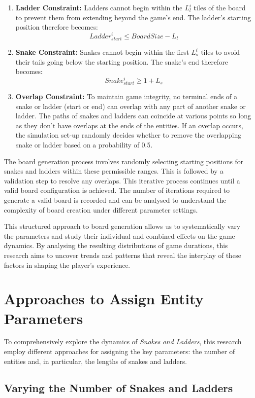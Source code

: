 \begin{enumerate}
	\item \textbf{Ladder Constraint:} Ladders cannot begin within the $L^{i}_{l}$ tiles of the board to prevent them from extending beyond the game's end. The ladder's starting position therefore becomes:  $$Ladder^{i}_{start} \leq BoardSize - L_{l}$$
	\item \textbf{Snake Constraint:} Snakes cannot begin within the first $L^{i}_{s}$ tiles to avoid their tails going below the starting position. The snake's end therefore becomes: $$Snake^{i}_{start}\geq 1 + L_{s}$$
	\item \textbf{Overlap Constraint:} To maintain game integrity, no terminal ends of a snake or ladder (start or end) can overlap with any part of another snake or ladder. The paths of snakes and ladders can coincide at various points so long as they don't have overlaps at the ends of the entities. If an overlap occurs, the simulation set-up randomly decides whether to remove the overlapping snake or ladder based on a probability of 0.5.
\end{enumerate}

The board generation process involves randomly selecting starting positions for snakes and ladders within these permissible ranges. This is followed by a validation step to resolve any overlaps. This iterative process continues until a valid board configuration is achieved. The number of iterations required to generate a valid board is recorded and can be analysed to understand the complexity of board creation under different parameter settings.

This structured approach to board generation allows us to systematically vary the parameters and study their individual and combined effects on the game dynamics. By analysing the resulting distributions of game durations, this research aims to uncover trends and patterns that reveal the interplay of these factors in shaping the player's experience.

\section{Approaches to Assign Entity Parameters}

To comprehensively explore the dynamics of \textit{Snakes and Ladders}, this research employ different approaches for assigning the key parameters: the number of entities and, in particular, the lengths of snakes and ladders.

\subsection{Varying the Number of Snakes and Ladders}

